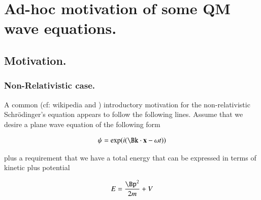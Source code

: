 
%
%



\chapter{Ad-hoc motivation of some QM wave equations. }
\label{chap:sch}
\date{ Dec 13, 2008.  $RCSfile: sch.tex,v $ Last $Revision: 1.11 $ $Date: 2009/06/14 23:51:45 $ }

%



\section{Motivation. }

\subsection{Non-Relativistic case. }

A common (cf: wikipedia and \citep{french1998iqp}) introductory motivation for the non-relativistic Schr\"{o}dinger's equation appears to follow the following lines.  Assume that
we desire a plane wave equation of the following form

\begin{align*}
\psi = \exp(i (\Bk \cdot \Bx - \omega t))
\end{align*}

plus a requirement that we have a total energy that can be expressed in terms of kinetic plus potential

\begin{align}\label{eqn:sch:energy}
E = \frac{\Bp^2}{2m} + V
\end{align}

